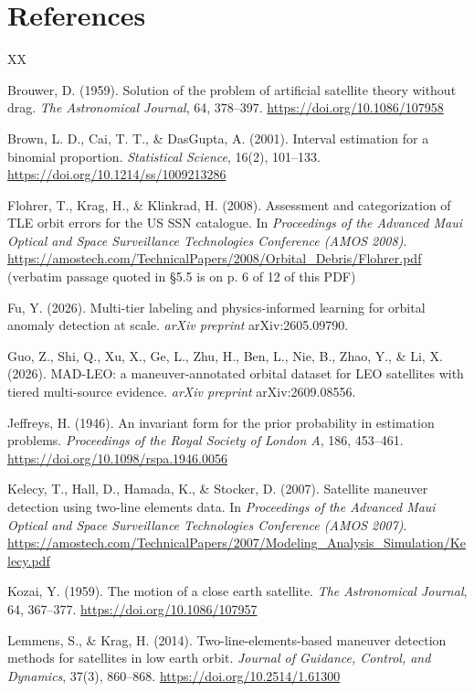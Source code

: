 \documentclass[11pt]{article}
\begin{document}
\section*{References}

\begin{thebibliography}{XX}

 Brouwer, D. (1959). Solution of the problem of artificial satellite theory without drag. \emph{The Astronomical Journal}, 64, 378--397. \url{https://doi.org/10.1086/107958}

 Brown, L. D., Cai, T. T., \& DasGupta, A. (2001). Interval estimation for a binomial proportion. \emph{Statistical Science}, 16(2), 101--133. \url{https://doi.org/10.1214/ss/1009213286}

 Flohrer, T., Krag, H., \& Klinkrad, H. (2008). Assessment and categorization of TLE orbit errors for the US SSN catalogue. In \emph{Proceedings of the Advanced Maui Optical and Space Surveillance Technologies Conference (AMOS 2008)}. \url{https://amostech.com/TechnicalPapers/2008/Orbital_Debris/Flohrer.pdf} (verbatim passage quoted in \S{}5.5 is on p. 6 of 12 of this PDF)

 Fu, Y. (2026). Multi-tier labeling and physics-informed learning for orbital anomaly detection at scale. \emph{arXiv preprint} arXiv:2605.09790.

 Guo, Z., Shi, Q., Xu, X., Ge, L., Zhu, H., Ben, L., Nie, B., Zhao, Y., \& Li, X. (2026). MAD-LEO: a maneuver-annotated orbital dataset for LEO satellites with tiered multi-source evidence. \emph{arXiv preprint} arXiv:2609.08556.

 Jeffreys, H. (1946). An invariant form for the prior probability in estimation problems. \emph{Proceedings of the Royal Society of London A}, 186, 453--461. \url{https://doi.org/10.1098/rspa.1946.0056}

 Kelecy, T., Hall, D., Hamada, K., \& Stocker, D. (2007). Satellite maneuver detection using two-line elements data. In \emph{Proceedings of the Advanced Maui Optical and Space Surveillance Technologies Conference (AMOS 2007)}. \url{https://amostech.com/TechnicalPapers/2007/Modeling_Analysis_Simulation/Kelecy.pdf}

 Kozai, Y. (1959). The motion of a close earth satellite. \emph{The Astronomical Journal}, 64, 367--377. \url{https://doi.org/10.1086/107957}

 Lemmens, S., \& Krag, H. (2014). Two-line-elements-based maneuver detection methods for satellites in low earth orbit. \emph{Journal of Guidance, Control, and Dynamics}, 37(3), 860--868. \url{https://doi.org/10.2514/1.61300}


\end{thebibliography}
\end{document}
